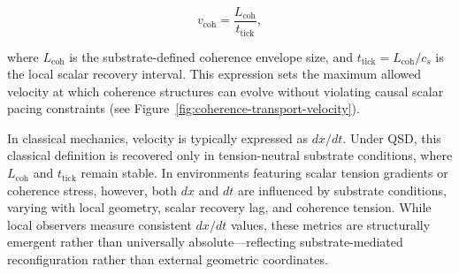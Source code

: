 \documentclass[preprints,article,submit,pdftex,moreauthors]{Definitions/mdpi}
\begin{document}
\begin{equation}
    v_{\text{coh}} = \frac{L_{\text{coh}}}{t_{\text{tick}}},
\end{equation}

where \( L_{\text{coh}} \) is the substrate-defined coherence envelope size, and \( t_{\text{tick}} = L_{\text{coh}}/c_s \) is the local scalar recovery interval. This expression sets the maximum allowed velocity at which coherence structures can evolve without violating causal scalar pacing constraints (see Figure~\ref{fig:coherence-transport-velocity}).

In classical mechanics, velocity is typically expressed as \(dx/dt\). Under QSD, this classical definition is recovered only in tension-neutral substrate conditions, where \(L_{\text{coh}}\) and \(t_{\text{tick}}\) remain stable. In environments featuring scalar tension gradients or coherence stress, however, both \(dx\) and \(dt\) are influenced by substrate conditions, varying with local geometry, scalar recovery lag, and coherence tension. While local observers measure consistent \(dx/dt\) values, these metrics are structurally emergent rather than universally absolute—reflecting substrate-mediated reconfiguration rather than external geometric coordinates.
\end{document}
